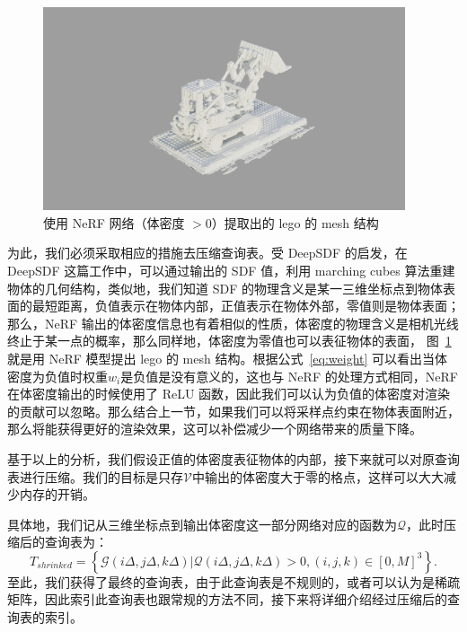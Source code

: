\begin{figure}[b]
    \centering
    \includegraphics[width=0.95\textwidth]{figures/legomesh_gray_complete.png}
    \caption{使用 NeRF 网络（体密度 $> 0$）提取出的 lego 的 mesh 结构}
    \label{fig:lego_mesh}
\end{figure}

为此，我们必须采取相应的措施去压缩查询表。受 DeepSDF \cite{park2019deepsdf}的启发，在 DeepSDF 这篇工作中，可以通过输出的 SDF 值，利用 marching cubes 算法\cite{lorensen1987marching}重建物体的几何结构，类似地，我们知道 SDF 的物理含义是某一三维坐标点到物体表面的最短距离，负值表示在物体内部，正值表示在物体外部，零值则是物体表面；那么，NeRF 输出的体密度信息也有着相似的性质，体密度的物理含义是相机光线终止于某一点的概率，那么同样地，体密度为零值也可以表征物体的表面， 图~\ref{fig:lego_mesh} 就是用 NeRF 模型提出 lego 的 mesh 结构。根据公式~\ref{eq:weight} 可以看出当体密度为负值时权重$w_i$是负值是没有意义的，这也与 NeRF 的处理方式相同，NeRF 在体密度输出的时候使用了 ReLU 函数，因此我们可以认为负值的体密度对渲染的贡献可以忽略。那么结合上一节，如果我们可以将采样点约束在物体表面附近，那么将能获得更好的渲染效果，这可以补偿减少一个网络带来的质量下降。

基于以上的分析，我们假设正值的体密度表征物体的内部，接下来就可以对原查询表进行压缩。我们的目标是只存$\mathcal{V}$中输出的体密度大于零的格点，这样可以大大减少内存的开销。

具体地，我们记从三维坐标点到输出体密度这一部分网络对应的函数为$\mathcal{Q}$，此时压缩后的查询表为：
\begin{equation}
    T_{shrinked} = \left\{
    \mathcal{G}\left(i\Delta, j\Delta, k\Delta\right) | \mathcal{Q}\left(i\Delta, j\Delta, k\Delta \right)  > 0, \left(i, j, k\right) \in \left[0, M\right]^3 
    \right\}.
\end{equation}
至此，我们获得了最终的查询表，由于此查询表是不规则的，或者可以认为是稀疏矩阵，因此索引此查询表也跟常规的方法不同，接下来将详细介绍经过压缩后的查询表的索引。

